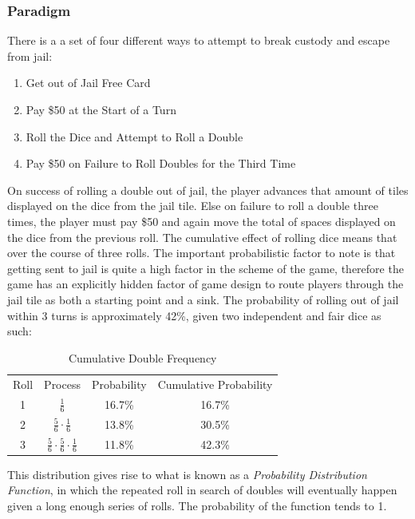 \documentclass[12pt]{article}
\begin{document}
\subsubsection{Paradigm}
There is a a set of four different ways to attempt to break custody and escape from jail:
\begin{enumerate}
  \item {Get out of Jail Free Card}\hfill
  \item {Pay \$50 at the Start of a Turn}\hfill
  \item {Roll the Dice and Attempt to Roll a Double} \hfill
  \item {Pay \$50 on Failure to Roll Doubles for the Third Time} \hfill
\end{enumerate}
On success of rolling a double out of jail, the player advances that amount of tiles displayed on the dice from the jail tile. Else on failure to roll a double three times, the player must pay \$50 and again move the total of spaces displayed on the dice from the previous roll. 
The cumulative effect of rolling dice means that over the course of three rolls.
The important probabilistic factor to note is that getting sent to jail is quite a high factor in the scheme of the game, therefore the game has an explicitly hidden factor of game design to route players through the jail tile as both a starting point and a sink.
The probability of rolling out of jail within 3 turns is approximately 42\%, given two independent and fair dice as such:

\begin{table}[h]
\centering
\label{Jail Cumulative Probability}
\begin{tabular}{cccc}
Roll & Process              & Probability & Cumulative Probability \\
1    & $\frac{1}{6}$                  & 16.7\%        & 16.7\%                   \\
2    & $\frac{5}{6}\cdot\frac{1}{6}$         & 13.8\%        & 30.5\%                   \\
3    & $\frac{5}{6}\cdot\frac{5}{6}\cdot\frac{1}{6}$ & 11.8\%        & 42.3\%                  
\end{tabular}
\caption{Cumulative Double Frequency}
\end{table}

This distribution gives rise to what is known as a \emph{Probability Distribution Function}, in which the repeated roll in search of doubles will eventually happen given a long enough series of rolls. The probability of the function tends to 1.
\end{document}
